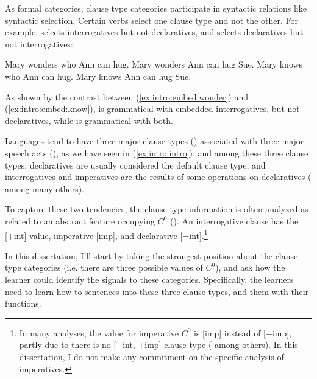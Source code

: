 As formal categories, clause type categories participate in syntactic relations like syntactic  selection. Certain verbs select one clause type and not the other. For example,  selects interrogatives but not declaratives, and  selects declaratives but not interrogatives:

\bxl
Mary wonders who Ann can hug.
\ex *Mary wonders Ann can hug Sue.
\exl
\ex \label{ex:intro:embed:know}
\bxl
Mary knows who Ann can hug.
\ex Mary knows Ann can hug Sue.
\exl
\eex

As shown by the contrast between (\ref{ex:intro:embed:wonder}) and (\ref{ex:intro:embed:know}),  is grammatical with embedded interrogatives, but not declaratives, while  is grammatical with both.



Languages tend to have three major clause types (\diis{}) associated with three major speech acts (\aqrs{}), as we have seen in (\ref{ex:intro:intro}), and among these three clause types, declaratives are usually considered the default clause type, and interrogatives and imperatives are the results of some operations on declaratives (\cite{sz1985speechact, chomsky1957,chomsky1995minimalist, akmajian1984clausetype, platzack1997imp,rizzi1997} among many others). 



To capture these two tendencies, the clause type information is often analyzed as related to an abstract feature occupying $C^{0}$ (\cite{chomsky1995minimalist, cheng1991, rizzi1997, rizzi2001int, chomskylasnik1977,platzack1997imp,akmajian1984clausetype, han1998imp}). An interrogative clause has the [+int] value, imperative [imp], and declarative [$-$int].\footnote{In many analyses, the value for imperative $C^{0}$ is [imp] instead of [$+$imp], partly due to there is no [$+$int, +imp] clause type (\cite{platzack1997imp,han1998imp} among others). In this dissertation, I do not make any commitment on the specific analysis of imperatives.} 




In this dissertation, I'll start by taking the strongest position about the clause type categories (i.e. there are three possible values of $C^{0}$), and ask how the learner could identify the signals to these categories. Specifically, the learners need to learn how to  sentences into these three clause types, and  them with their functions. 

